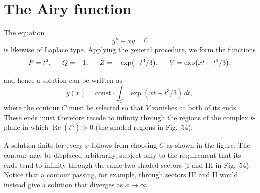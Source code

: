 \renewcommand{\thesection}{\alph{section}}
\setcounter{section}{1}
\section{The Airy function}
\setcounter{figure}{53}

The equation
\begin{equation}
 y''-xy=0
 \tag{b.1}
\end{equation}
is likewise of Laplace type. Applying the general procedure, we form the
functions
\[
 P=t^2,\hspace{1.5em}Q=-1,\hspace{1.5em}
 Z=-\exp(-t^3/3),\hspace{1.5em}V=\exp(xt-t^3/3),
\]

and hence a solution can be written as
\begin{equation}
 y(x)=\mathrm{const}\cdot\int_C\exp(xt-t^3/3)\,dt,
 \tag{b.2}
\end{equation}
where the contour $C$ must be selected so that $V$ vanishes at both of its
ends. These ends must therefore recede to infinity through the regions of the
complex $t$-plane in which $\operatorname{Re}(t^3)>0$ (the shaded regions in
Fig.~54).

A solution finite for every $x$ follows from choosing $C$ as shown in the
figure. The contour may be displaced arbitrarily, subject only to the
requirement that its ends tend to infinity through the same two shaded
sectors (I and III in Fig.~54). Notice that a contour passing, for example,
through sectors III and II would instead give a solution that diverges as
$x\to\infty$.

